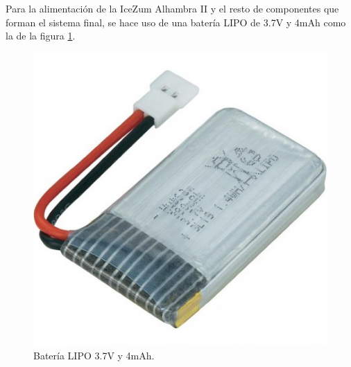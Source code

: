 Para la alimentación de la IceZum Alhambra II y el resto de componentes que forman el sistema final, se hace uso de una batería LIPO de 3.7V y 4mAh como la de la figura \ref{fig:lipo37}. 
\begin{center}
	\begin{figure}[H]
		\center
		\includegraphics[scale=0.5]{imagenes/Balancing_Robot/LIPO37}
		\caption{Batería LIPO 3.7V y 4mAh.}
		\label{fig:lipo37}
	\end{figure}
\end{center}





